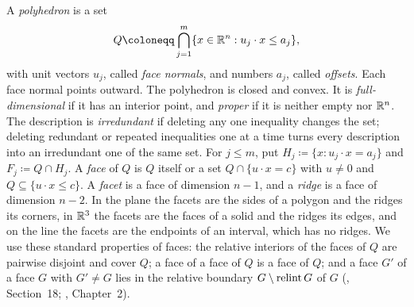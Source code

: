 A \emph{polyhedron} is a set
\[
 Q\coloneqq \bigcap_{j=1}^m\{x\in\R^n:u_j\cdot x\le a_j\},
\]
with unit vectors \(u_j\), called \emph{face normals}, and numbers
\(a_j\), called \emph{offsets}. Each face normal points outward.
The polyhedron is closed and convex. It is
\emph{full-dimensional} if it has an interior point, and \emph{proper} if it
is neither empty nor \(\mathbb R^n\). The description is \emph{irredundant} if
deleting any one inequality changes the set; deleting redundant or repeated
inequalities one at a time turns every description into an irredundant one
of the same set. For \(j\le m\), put \(H_j\coloneqq \{x:u_j\cdot x=a_j\}\) and
\(F_j\coloneqq Q\cap H_j\). A \emph{face} of \(Q\) is \(Q\) itself or a set
\(Q\cap\{u\cdot x=c\}\) with \(u\ne0\) and \(Q\subseteq\{u\cdot x\le c\}\).
A \emph{facet} is a face of dimension \(n-1\), and a \emph{ridge} is a face
of dimension \(n-2\). In the plane the facets are the sides of a polygon
and the ridges its corners, in \(\mathbb R^3\) the facets are the faces of a solid
and the ridges its edges, and on the line the facets are the endpoints of an
interval, which has no ridges. We use these standard properties of faces:
the relative interiors of the faces of \(Q\) are pairwise disjoint and cover
\(Q\); a face of a face of \(Q\) is a face of \(Q\); and a face \(G'\)
of a face \(G\) with \(G'\ne G\) lies in the relative boundary
\(G\setminus\operatorname{relint} G\) of \(G\) (, Section~18; , Chapter~2).

